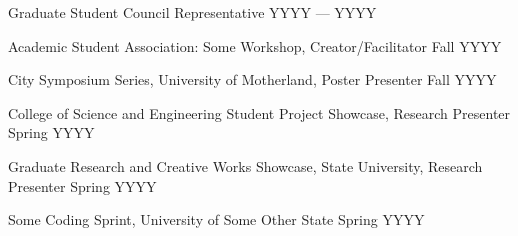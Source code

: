 Graduate Student Council Representative	\hfill YYYY --- YYYY
 
Academic Student Association: Some Workshop, Creator/Facilitator	\hfill Fall YYYY

City Symposium Series, University of Motherland, Poster Presenter	\hfill Fall YYYY

College of Science and Engineering Student Project Showcase, Research Presenter	\hfill Spring YYYY

Graduate Research and Creative Works Showcase, State University, Research Presenter	\hfill Spring YYYY

Some Coding Sprint, University of Some Other State	\hfill Spring YYYY



